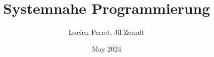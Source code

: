 \documentclass[a4paper, fontsize = 8pt, landscape]{scrartcl}
\title{Systemnahe Programmierung}
\author{Lucien Perret, Jil Zerndt}
\date{May 2024}
\begin{document}
\begin{multicols*}{3}
    \thispagestyle{TitlePageStyle}
		\maketitle


\end{multicols*}
\end{document}
